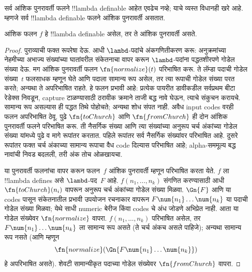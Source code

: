 \documentclass[../../../include/open-logic-section]{subfiles}
\begin{document}

सर्व आंशिक पुनरावर्ती फलने !!{lambda definable}
आहेत एवढेच नव्हे; याचे व्यस्त विधानही खरे आहे.
म्हणजे सर्व !!{lambda definable} फलने आंशिक
पुनरावर्ती असतात.

\begin{thm}
   आंशिक फलन $f$
  हे !!{lambda definable} असेल, तर ते आंशिक
  पुनरावर्ती असते.
\end{thm}

\begin{proof}
  पुराव्याची फक्त रूपरेषा देऊ. आधी $\lambd$-पदांचे
  अंकगणितीकरण करू: अनुक्रमांच्या नेहमीच्या अभाज्य
  संख्यांच्या घातांवरील संकेतनाचा वापर करून
  $\lambd$-पदांना पद्धतशीरपणे गोडेल संख्या देऊ.
  मग आंशिक पुनरावर्ती फलन $\fn{normalize}(t)$
  परिभाषित करू. ते लॅम्डा पदाची गोडेल संख्या~$t$
  फलसाधक म्हणून घेते आणि पदाला सामान्य रूप
  असेल, तर त्या रूपाची गोडेल संख्या परत करते;
  अन्यथा ते अपरिभाषित राहते. हे फलन प्रभावी आहे:
  प्रत्येक पायरीत डावीकडील सर्वप्रथम बीटा रेडेक्स
  निवडून, capture टाळण्यासाठी ठरावीक क्रमाने ताजी
  बद्ध नावे घेऊन, त्याचे संकुचन करायचे. सामान्य रूप
  असल्यास ही पद्धत तिथे पोहोचते; अन्यथा शोध संपत नाही.
  अवैध input codes वरही फलन अपरिभाषित ठेवू. पुढे
  $\fn{toChurch}$ आणि $\fn{fromChurch}$ ही दोन
  आंशिक पुनरावर्ती फलने परिभाषित करू. ती नैसर्गिक
  संख्या आणि त्या संख्यांच्या अनुरूप चर्च अंकांच्या
  गोडेल संख्या यांमध्ये पुढे व मागे रूपांतर करतात.
  पहिले रूपांतर सर्व नैसर्गिक संख्यांवर परिभाषित आहे.
  दुसरे रूपांतर फक्त चर्च अंकाच्या सामान्य रूपाचा वैध
  code दिल्यास परिभाषित आहे; alpha-सममूल्य बद्ध
  नावांची निवड बदलली, तरी अंक तोच ओळखायचा.

  या पुनरावर्ती फलनांचा वापर करून फलन~$f$
  आंशिक पुनरावर्ती म्हणून परिभाषित करता येते.
  $f$ ला !!{lambda define}s असे $\lambd$-पद~$F$
  आहे. $f(n_1, \dots, n_k)$ संगणित करण्यासाठी
  आधी $\fn{toChurch}(n_i)$ वापरून अनुरूप चर्च
  अंकांच्या गोडेल संख्या मिळवा. $\Gn{F}$ आणि या
  codes पासून संकेतनातील प्रभावी उपयोजन रचनाकार
  वापरून $F \num{n_1}\dots\num{n_k}$ या पदाची
  गोडेल संख्या मिळवा; येथे साधी numeric बेरीज किंवा
  codes चे अंध जोडणे अभिप्रेत नाही. आता या गोडेल संख्येवर
  $\fn{normalize}$ वापरा. $f(n_1, \dots, n_k)$
  परिभाषित असेल, तर
  $F \num{n_1}\dots\num{n_k}$ ला सामान्य रूप
  असते (ते चर्च अंकच असले पाहिजे); अन्यथा सामान्य
  रूप नसते (आणि म्हणून
  \[\fn{normalize}(\Gn{F\num{n_1}\dots\num{n_k}})\]
  हे अपरिभाषित असते). शेवटी सामान्यीकृत पदाच्या
  गोडेल संख्येवर $\fn{fromChurch}$ वापरा.
\end{proof}
\end{document}
